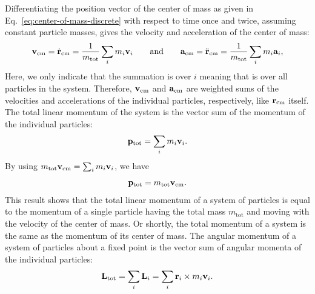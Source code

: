 \documentclass[12pt]{article}
\begin{document}
Differentiating the position vector of the center of mass as given in Eq.~\eqref{eq:center-of-mass-discrete} with respect to time once and twice, assuming constant particle masses, gives the velocity and acceleration of the center of mass:
\begin{equation}
    \vb{v}_{\text{cm}} = \dot{\vb{r}}_{\text{cm}}
    = \frac{1}{m_{\text{tot}}}\sum_{i}m_i\vb{v}_i \qquad\text{and}\qquad
    \vb{a}_{\text{cm}} = \ddot{\vb{r}}_{\text{cm}}
    = \frac{1}{m_{\text{tot}}}\sum_{i}m_i\vb{a}_i,
    \label{eq:velocity-acceleration-center-of-mass}
\end{equation}
Here, we only indicate that the summation is over $i$ meaning that is over all particles in the system. Therefore, $\vb{v}_{\text{cm}}$ and $\vb{a}_{\text{cm}}$ are weighted sums of the velocities and accelerations of the individual particles, respectively, like $\vb{r}_{\text{cm}}$ itself. The total linear momentum of the system is the vector sum of the momentum of the individual particles:
\[
    \vb{p}_{\text{tot}} = \sum_{i}m_i\vb{v}_i.
\]
By using $m_{\text{tot}}\vb{v}_{\text{cm}} = \sum_i m_i\vb{v}_i$, we have
\begin{equation}
    \vb{p}_{\text{tot}} = m_{\text{tot}}\vb{v}_{\text{cm}}.
    \label{eq:total-momentum-center-of-mass}
\end{equation}
This result shows that the total linear momentum of a system of particles is equal to the momentum of a single particle having the total mass $m_{\text{tot}}$ and moving with the velocity of the center of mass. Or shortly, the total momentum of a system is the same as the momentum of its center of mass. The angular momentum of a system of particles about a fixed point is the vector sum of angular momenta of the individual particles:
\begin{equation}
    \vb{L}_{\text{tot}} = \sum_i \vb{L}_i = \sum_{i}\vb{r}_i\times m_i\vb{v}_i.
    \label{eq:angular-momentum-center-of-mass}
\end{equation}
\end{document}
